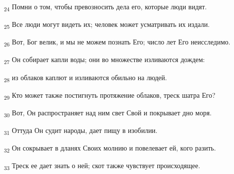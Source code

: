 \begin{tcolorbox}
\textsubscript{24} Помни о том, чтобы превозносить дела его, которые люди видят.
\end{tcolorbox}
\begin{tcolorbox}
\textsubscript{25} Все люди могут видеть их; человек может усматривать их издали.
\end{tcolorbox}
\begin{tcolorbox}
\textsubscript{26} Вот, Бог велик, и мы не можем познать Его; число лет Его неисследимо.
\end{tcolorbox}
\begin{tcolorbox}
\textsubscript{27} Он собирает капли воды; они во множестве изливаются дождем:
\end{tcolorbox}
\begin{tcolorbox}
\textsubscript{28} из облаков каплют и изливаются обильно на людей.
\end{tcolorbox}
\begin{tcolorbox}
\textsubscript{29} Кто может также постигнуть протяжение облаков, треск шатра Его?
\end{tcolorbox}
\begin{tcolorbox}
\textsubscript{30} Вот, Он распространяет над ним свет Свой и покрывает дно моря.
\end{tcolorbox}
\begin{tcolorbox}
\textsubscript{31} Оттуда Он судит народы, дает пищу в изобилии.
\end{tcolorbox}
\begin{tcolorbox}
\textsubscript{32} Он сокрывает в дланях Своих молнию и повелевает ей, кого разить.
\end{tcolorbox}
\begin{tcolorbox}
\textsubscript{33} Треск ее дает знать о ней; скот также чувствует происходящее.
\end{tcolorbox}
